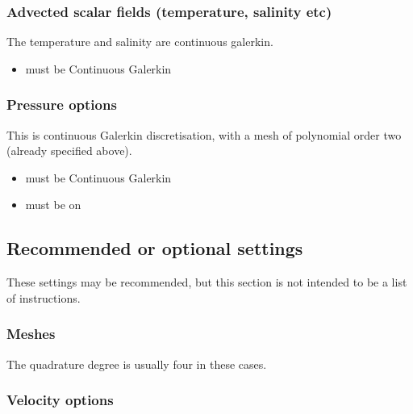 \subsubsection{Advected scalar fields (temperature, salinity etc)}
The temperature and salinity are continuous galerkin. 

\begin{itemize}
\item {} must be Continuous Galerkin
\end{itemize}

\subsubsection{Pressure options}

This is continuous Galerkin discretisation, with a mesh of polynomial order two (already specified above).

\begin{itemize}
\item {} must be Continuous Galerkin
\item {} must be on
\end{itemize}

\subsection{Recommended or optional settings}
These settings may be recommended, but this section is not intended to be a list of instructions.

\subsubsection{Meshes}

The quadrature degree is usually four in these cases.

\subsubsection{Velocity options}

